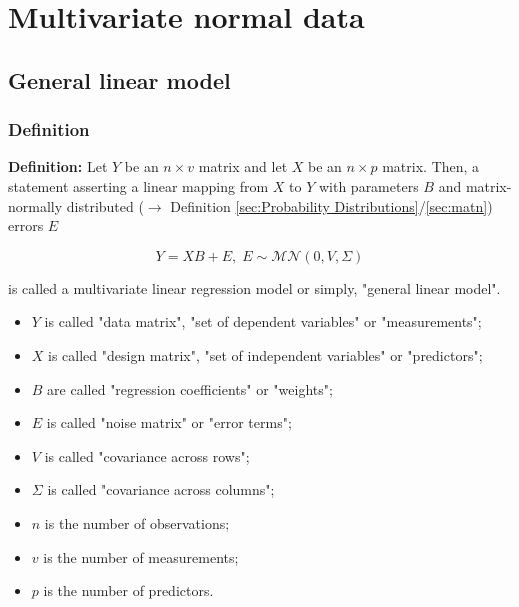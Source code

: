 \documentclass[a4paper,12pt,twoside]{book}
\begin{document}
\pagebreak
\section{Multivariate normal data}

\subsection{General linear model}

\subsubsection[\textit{Definition}]{Definition} \label{sec:glm}
\setcounter{equation}{0}

\textbf{Definition:} Let $Y$ be an $n \times v$ matrix and let $X$ be an $n \times p$ matrix. Then, a statement asserting a linear mapping from $X$ to $Y$ with parameters $B$ and matrix-normally distributed ($\rightarrow$ Definition \ref{sec:Probability Distributions}/\ref{sec:matn}) errors $E$

\begin{equation} \label{eq:glm-glm}
Y = X B + E, \; E \sim \mathcal{MN}(0, V, \Sigma)
\end{equation}

is called a multivariate linear regression model or simply, "general linear model".

\begin{itemize}

\item $Y$ is called "data matrix", "set of dependent variables" or "measurements";

\item $X$ is called "design matrix", "set of independent variables" or "predictors";

\item $B$ are called "regression coefficients" or "weights";

\item $E$ is called "noise matrix" or "error terms";

\item $V$ is called "covariance across rows";

\item $\Sigma$ is called "covariance across columns";

\item $n$ is the number of observations;

\item $v$ is the number of measurements;

\item $p$ is the number of predictors.

\end{itemize}
\end{document}
